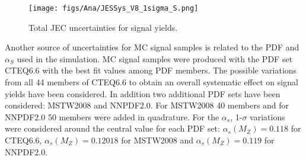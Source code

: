 \begin{figure}[!Hhtbp]
  \begin{center}
    \texttt{[image: figs/Ana/JESSys\_V8\_1sigma\_S.png]}
    \caption{Total JEC uncertainties for signal yields.}
    \label{fig:TotalJECSys}
  \end{center}
\end{figure}


Another source of uncertainties for MC signal samples is related to the PDF and $\alpha_{S}$ used in the simulation. MC signal samples were produced with the PDF set CTEQ6.6 with the best fit values among PDF members. The possible variations from all 44 members of CTEQ6.6 to obtain an overall systematic effect on signal yields have been considered. In addition two additional PDF sets have been considered: MSTW2008 and NNPDF2.0. For MSTW2008 40 members and for NNPDF2.0 50 members were added in quadrature. For the $\alpha_{s}$, 1-$\sigma$ variations were considered around the central value for each PDF set: $\alpha_{s}(M_{Z})=0.118$ for CTEQ6.6, $\alpha_{s}(M_{Z})=0.12018$ for MSTW2008 and $\alpha_{s}(M_{Z})=0.119$ for NNPDF2.0. 

